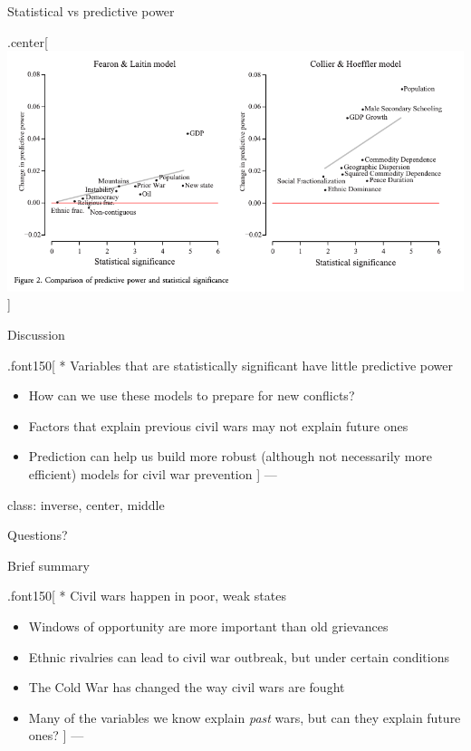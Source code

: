 \documentclass[ignorenonframetext,]{beamer}
\begin{document}
\begin{frame}{Statistical vs predictive power}

\begin{block}{.center{[}\includegraphics{ward01.png}{]}}

\end{block}

\end{frame}

\begin{frame}{Discussion}

.font150{[} * Variables that are statistically significant have little
predictive power

\begin{itemize}
\item
  How can we use these models to prepare for new conflicts?
\item
  Factors that explain previous civil wars may not explain future ones
\item
  Prediction can help us build more robust (although not necessarily
  more efficient) models for civil war prevention {]} ---
\end{itemize}

class: inverse, center, middle

\end{frame}

\begin{frame}{Questions?}

\end{frame}

\begin{frame}{Brief summary}

.font150{[} * Civil wars happen in poor, weak states

\begin{itemize}
\item
  Windows of opportunity are more important than old grievances
\item
  Ethnic rivalries can lead to civil war outbreak, but under certain
  conditions
\item
  The Cold War has changed the way civil wars are fought
\item
  Many of the variables we know explain \emph{past} wars, but can they
  explain future ones? {]} ---
\end{itemize}

\end{frame}
\end{document}
